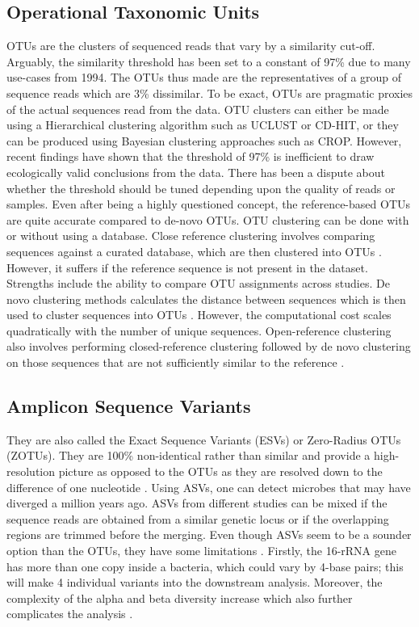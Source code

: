 \subsection{Operational Taxonomic Units}
OTUs are the clusters of sequenced reads that vary by a similarity cut-off. Arguably, the similarity threshold has been set to a constant of 97\% due to many use-cases from 1994. The OTUs thus made are the representatives of a group of sequence reads which are 3\% dissimilar. To be exact, OTUs are pragmatic proxies of the actual sequences read from the data. OTU clusters can either be made using a Hierarchical clustering algorithm such as UCLUST or CD-HIT, or they can be produced using Bayesian clustering approaches such as CROP. However, recent findings have shown that the threshold of 97\% is inefficient to draw ecologically valid conclusions from the data. There has been a dispute about whether the threshold should be tuned depending upon the quality of reads or samples. Even after being a highly questioned concept, the reference-based OTUs are quite accurate compared to de-novo OTUs. OTU clustering can be done with or without using a database. Close reference clustering involves comparing sequences against a curated database, which are then clustered into OTUs \cite{ref15}. However, it suffers if the reference sequence is not present in the dataset. Strengths include the ability to compare OTU assignments across studies. De novo clustering methods calculates the distance between sequences which is then used to cluster sequences into OTUs \cite{ref15}. However, the computational cost scales quadratically with the number of unique sequences. Open-reference clustering also involves performing closed-reference clustering followed by de novo clustering on those sequences that are not sufficiently similar to the reference \cite{ref15}.

\subsection{Amplicon Sequence Variants}
They are also called the Exact Sequence Variants (ESVs) or Zero-Radius OTUs (ZOTUs). They are 100\% non-identical rather than similar and provide a high-resolution picture as opposed to the OTUs as they are resolved down to the difference of one nucleotide \cite{ref16}. Using ASVs, one can detect microbes that may have diverged a million years ago. ASVs from different studies can be mixed if the sequence reads are obtained from a similar genetic locus or if the overlapping regions are trimmed before the merging. Even though ASVs seem to be a sounder option than the OTUs, they have some limitations \cite{ref16}. Firstly, the 16-rRNA gene has more than one copy inside a bacteria, which could vary by 4-base pairs; this will make 4 individual variants into the downstream analysis. Moreover, the complexity of the alpha and beta diversity increase which also further complicates the analysis \cite{ref16}.